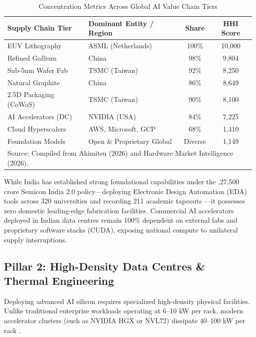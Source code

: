 \documentclass[conference,a4paper]{IEEEtran}
\begin{document}
\begin{table}[htbp]
\caption{Concentration Metrics Across Global AI Value Chain Tiers}
\begin{center}
\begin{tabularx}{\columnwidth}{lXcc}
\toprule
\textbf{Supply Chain Tier} & \textbf{Dominant Entity / Region} & \textbf{Share} & \textbf{HHI Score} \\
\midrule
EUV Lithography & ASML (Netherlands) & 100\% & 10,000 \\
Refined Gallium & China & 98\% & 9,804 \\
Sub-5nm Wafer Fab & TSMC (Taiwan) & 92\% & 8,250 \\
Natural Graphite & China & 86\% & 8,649 \\
2.5D Packaging (CoWoS) & TSMC (Taiwan) & 90\% & 8,100 \\
AI Accelerators (DC) & NVIDIA (USA) & 84\% & 7,225 \\
Cloud Hyperscalers & AWS, Microsoft, GCP & 68\% & 1,410 \\
Foundation Models & Open \& Proprietary Global & Diverse & 1,149 \\
\bottomrule
\multicolumn{4}{l}{\footnotesize Source: Compiled from Akimitsu (2026) and Hardware Market Intelligence (2026).}
\end{tabularx}
\label{tab:hhi}
\end{center}
\end{table}

While India has established strong foundational capabilities under the ,27,500 crore Semicon India 2.0 policy—deploying Electronic Design Automation (EDA) tools across 320 universities and recording 211 academic tapeouts \cite{meity2026semicon}—it possesses zero domestic leading-edge fabrication facilities. Commercial AI accelerators deployed in Indian data centres remain 100\% dependent on external fabs and proprietary software stacks (CUDA), exposing national compute to unilateral supply interruptions.

\subsection{Pillar 2: High-Density Data Centres \& Thermal Engineering}
Deploying advanced AI silicon requires specialized high-density physical facilities. Unlike traditional enterprise workloads operating at 6–10 kW per rack, modern accelerator clusters (such as NVIDIA HGX or NVL72) dissipate 40–100 kW per rack \cite{ieee_tcpmt2026cooling}. 
\end{document}
